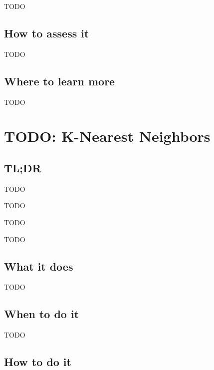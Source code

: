 \documentclass[
]{book}
\providecommand{\tightlist}{%
  \setlength{\itemsep}{0pt}\setlength{\parskip}{0pt}}
\begin{document}
TODO

\hypertarget{how-to-assess-it-5}{%
\section{How to assess it}\label{how-to-assess-it-5}}

TODO

\hypertarget{where-to-learn-more-5}{%
\section{Where to learn more}\label{where-to-learn-more-5}}

TODO

\hypertarget{k-nearest-neighbors}{%
\chapter{TODO: K-Nearest Neighbors}\label{k-nearest-neighbors}}

\hypertarget{tldr-6}{%
\section{TL;DR}\label{tldr-6}}

\begin{description}
\tightlist
\item[What it does]
TODO
\item[When to do it]
TODO
\item[How to do it]
TODO
\item[How to assess it]
TODO
\end{description}

\hypertarget{what-it-does-6}{%
\section{What it does}\label{what-it-does-6}}

TODO

\hypertarget{when-to-do-it-6}{%
\section{When to do it}\label{when-to-do-it-6}}

TODO

\hypertarget{how-to-do-it-6}{%
\section{How to do it}\label{how-to-do-it-6}}
\end{document}
